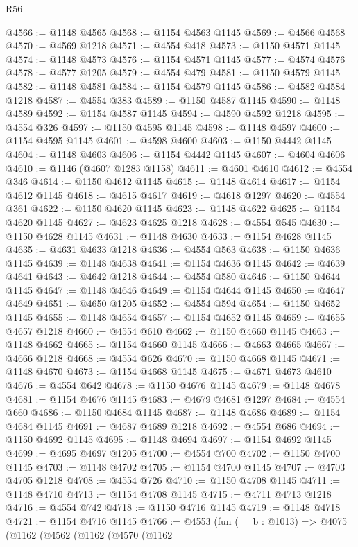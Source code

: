 \begin{lexlean}{R56}
\begin{coremodule}
@4566 := @1148 @4565
@4568 := @1154 @4563 @1145
@4569 := @4566 @4568
@4570 := @4569 @1218
@4571 := @4554 @418
@4573 := @1150 @4571 @1145
@4574 := @1148 @4573
@4576 := @1154 @4571 @1145
@4577 := @4574 @4576
@4578 := @4577 @1205
@4579 := @4554 @479
@4581 := @1150 @4579 @1145
@4582 := @1148 @4581
@4584 := @1154 @4579 @1145
@4586 := @4582 @4584 @1218
@4587 := @4554 @383
@4589 := @1150 @4587 @1145
@4590 := @1148 @4589
@4592 := @1154 @4587 @1145
@4594 := @4590 @4592 @1218
@4595 := @4554 @326
@4597 := @1150 @4595 @1145
@4598 := @1148 @4597
@4600 := @1154 @4595 @1145
@4601 := @4598 @4600
@4603 := @1150 @4442 @1145
@4604 := @1148 @4603
@4606 := @1154 @4442 @1145
@4607 := @4604 @4606
@4610 := @1146 (@4607 @1283 @1158)
@4611 := @4601 @4610
@4612 := @4554 @346
@4614 := @1150 @4612 @1145
@4615 := @1148 @4614
@4617 := @1154 @4612 @1145
@4618 := @4615 @4617
@4619 := @4618 @1297
@4620 := @4554 @361
@4622 := @1150 @4620 @1145
@4623 := @1148 @4622
@4625 := @1154 @4620 @1145
@4627 := @4623 @4625 @1218
@4628 := @4554 @545
@4630 := @1150 @4628 @1145
@4631 := @1148 @4630
@4633 := @1154 @4628 @1145
@4635 := @4631 @4633 @1218
@4636 := @4554 @563
@4638 := @1150 @4636 @1145
@4639 := @1148 @4638
@4641 := @1154 @4636 @1145
@4642 := @4639 @4641
@4643 := @4642 @1218
@4644 := @4554 @580
@4646 := @1150 @4644 @1145
@4647 := @1148 @4646
@4649 := @1154 @4644 @1145
@4650 := @4647 @4649
@4651 := @4650 @1205
@4652 := @4554 @594
@4654 := @1150 @4652 @1145
@4655 := @1148 @4654
@4657 := @1154 @4652 @1145
@4659 := @4655 @4657 @1218
@4660 := @4554 @610
@4662 := @1150 @4660 @1145
@4663 := @1148 @4662
@4665 := @1154 @4660 @1145
@4666 := @4663 @4665
@4667 := @4666 @1218
@4668 := @4554 @626
@4670 := @1150 @4668 @1145
@4671 := @1148 @4670
@4673 := @1154 @4668 @1145
@4675 := @4671 @4673 @4610
@4676 := @4554 @642
@4678 := @1150 @4676 @1145
@4679 := @1148 @4678
@4681 := @1154 @4676 @1145
@4683 := @4679 @4681 @1297
@4684 := @4554 @660
@4686 := @1150 @4684 @1145
@4687 := @1148 @4686
@4689 := @1154 @4684 @1145
@4691 := @4687 @4689 @1218
@4692 := @4554 @686
@4694 := @1150 @4692 @1145
@4695 := @1148 @4694
@4697 := @1154 @4692 @1145
@4699 := @4695 @4697 @1205
@4700 := @4554 @700
@4702 := @1150 @4700 @1145
@4703 := @1148 @4702
@4705 := @1154 @4700 @1145
@4707 := @4703 @4705 @1218
@4708 := @4554 @726
@4710 := @1150 @4708 @1145
@4711 := @1148 @4710
@4713 := @1154 @4708 @1145
@4715 := @4711 @4713 @1218
@4716 := @4554 @742
@4718 := @1150 @4716 @1145
@4719 := @1148 @4718
@4721 := @1154 @4716 @1145
@4766 := @4553
    (fun (__b : @1013) =>
    @4075
      (@1162
        (@4562
          (@1162
            (@4570
              (@1162

\end{coremodule}
\end{lexlean}
